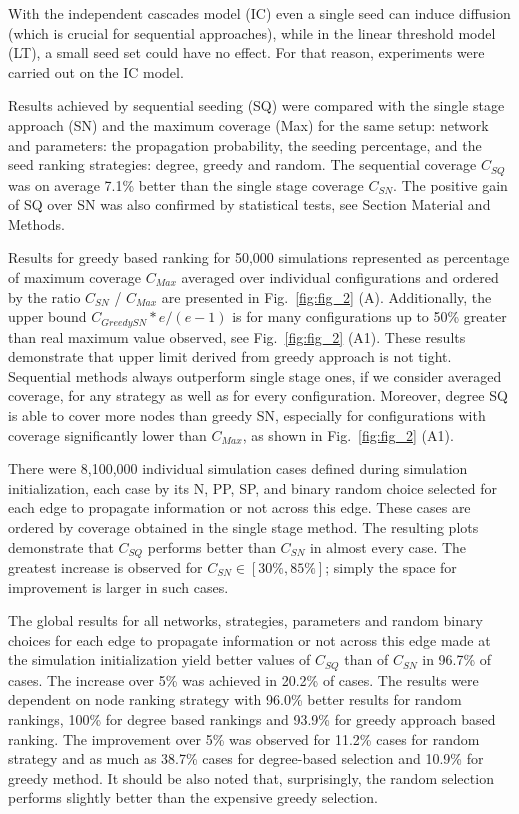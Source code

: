 \documentclass[11pt]{article} %
\begin{document}
With the independent cascades model (IC) even a single seed can induce diffusion (which is crucial for sequential approaches), while in the linear threshold model \cite{Kempe:2003} (LT), a small seed set could have no effect. For that reason, experiments were carried out on the IC model.


Results achieved by sequential seeding (SQ) were compared with the single stage approach (SN) and the maximum coverage (Max) for the same setup: network and parameters: the propagation probability, the seeding percentage, and the seed ranking strategies: degree, greedy and random. The sequential coverage $C_{SQ}$ was on average 7.1\% better than the single stage coverage $C_{SN}$. 
The positive gain of SQ over SN was also confirmed by statistical tests, see Section Material and Methods. 

Results for greedy based ranking for 50,000 simulations represented as percentage of maximum coverage $C_{Max}$ averaged over individual configurations and ordered by the ratio $C_{SN}$ / $C_{Max}$ are presented in Fig.~\ref{fig:fig_2} (A). Additionally, the upper bound $C_{GreedySN} * e/(e-1)$ \cite{Kempe:2003} is for many configurations up to 50\% greater than real maximum value observed, see Fig.~\ref{fig:fig_2} (A1). These results demonstrate that upper limit derived from greedy approach is not tight. Sequential methods always outperform single stage ones, if we consider averaged coverage, for any strategy as well as for every configuration. Moreover, degree SQ is able to cover more nodes than greedy SN, especially for configurations with coverage significantly lower than $C_{Max}$, as shown in Fig.~\ref{fig:fig_2} (A1).

There were 8,100,000 individual simulation cases defined during simulation initialization, each case by its N, PP, SP, and binary random choice selected for each edge to propagate information or not across this edge. These cases are ordered by coverage obtained in the single stage method. The resulting plots demonstrate that $C_{SQ}$ performs better than $C_{SN}$ in almost every case. The greatest increase is observed for $C_{SN} \in [30\%,85\%]$; simply the space for improvement is larger in such cases.
 
The global results for all networks, strategies, parameters and random binary choices for each edge to propagate information or not across this edge made at the simulation initialization yield better values of $C_{SQ}$ than of $C_{SN}$ in 96.7\% of cases. The increase over 5\% was achieved in 20.2\% of cases. The results were dependent on node ranking strategy with 96.0\% better results for random rankings, 100\% for degree based rankings and 93.9\% for greedy approach based ranking. The improvement over 5\% was observed for 11.2\% cases for random strategy and as much as 38.7\% cases for degree-based selection and 10.9\% for greedy method. It should be also noted that, surprisingly, the random selection performs slightly better than the expensive greedy selection.
\end{document}
